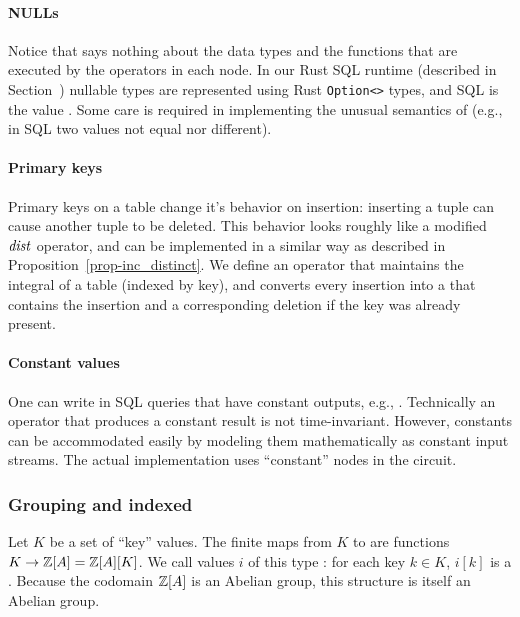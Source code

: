 \paragraph{NULLs} Notice that \dbsp says nothing about the data types
and the functions that are executed by the operators in each node.  In
our Rust SQL runtime (described in Section~)
nullable types are represented using Rust \texttt{Option<>} types, and
SQL  is the value .  Some care is required in
implementing the unusual semantics of  (e.g., in SQL two
 values not equal nor different).

\paragraph{Primary keys}

Primary keys on a table change it's behavior on insertion: inserting a
tuple can cause another tuple to be deleted.  This behavior looks
roughly like a modified $\mathit{dist}$ operator, and can be implemented
in a similar way as described in Proposition~\ref{prop-inc_distinct}.
We define an  operator that maintains the integral of a
table (indexed by key), and converts every insertion into a \zr that
contains the insertion and a corresponding deletion if the key was
already present.

\paragraph{Constant values}

One can write in SQL queries that have constant outputs, e.g.,
.  Technically an operator that produces a constant
result is not time-invariant.  However, constants can be accommodated
easily by modeling them mathematically as constant input streams.
The actual implementation uses ``constant'' nodes in the circuit.

\subsubsection{Grouping and indexed \zrs}\label{sec:grouping}

Let $K$ be a set of ``key'' values.  The finite maps from $K$ to \zrs
are functions $K \to \mathbb{Z}[A] = \mathbb{Z}[A][K]$.  We call values $i$ of this
type : for each key $k \in K$, $i[k]$ is a \zr.
Because the codomain $\mathbb{Z}[A]$ is an Abelian group, this structure is
itself an Abelian group.

